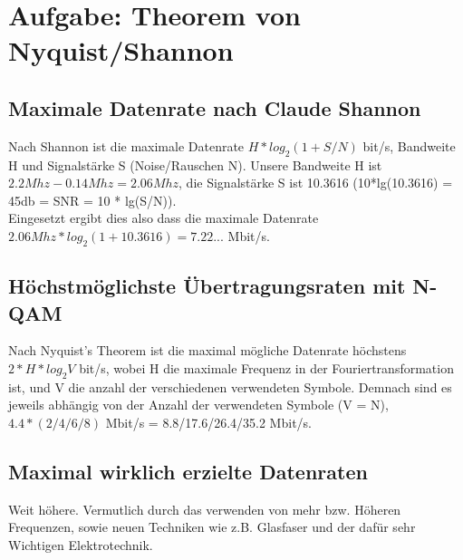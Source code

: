 \documentclass{scrartcl}
\begin{document}
\subsection{}
\subsection{}


\section{Aufgabe: Theorem von Nyquist/Shannon}
\subsection{Maximale Datenrate nach Claude Shannon}
Nach Shannon ist die maximale Datenrate $H*log_2(1 + S/N)$ bit/s, Bandweite H und Signalstärke S (Noise/Rauschen N).
Unsere Bandweite H ist $2.2 Mhz - 0.14 Mhz = 2.06 Mhz$, die Signalstärke S ist 10.3616 (10*lg(10.3616) = 45db = SNR = 10 * lg(S/N)). \\
Eingesetzt ergibt dies also dass die maximale Datenrate $2.06 Mhz * log_2(1 + 10.3616) = 7.22...$ Mbit/s.

\subsection{Höchstmöglichste Übertragungsraten mit N-QAM}
Nach Nyquist's Theorem ist die maximal mögliche Datenrate höchstens $2 * H * log_2 V$ bit/s, wobei
H die maximale Frequenz in der Fouriertransformation ist, und V die anzahl der verschiedenen verwendeten Symbole.
Demnach sind es jeweils abhängig von der Anzahl der verwendeten Symbole (V = N), $4.4 * (2/4/6/8)$ Mbit/s = 8.8/17.6/26.4/35.2 Mbit/s.

\subsection{Maximal wirklich erzielte Datenraten}
Weit höhere. Vermutlich durch das verwenden von mehr bzw. Höheren Frequenzen, sowie neuen Techniken wie z.B. Glasfaser und der dafür
sehr Wichtigen Elektrotechnik.
\end{document}
